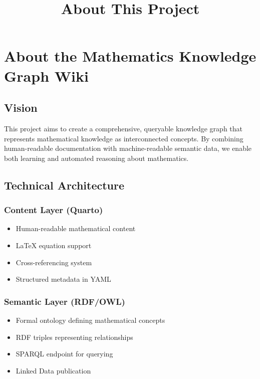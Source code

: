 \documentclass[
  11pt,
  a4paper,
]{article}
\title{About This Project}
\author{}
\date{}
\providecommand{\tightlist}{%
  \setlength{\itemsep}{0pt}\setlength{\parskip}{0pt}}
\begin{document}
\maketitle


\section{About the Mathematics Knowledge Graph
Wiki}\label{about-the-mathematics-knowledge-graph-wiki}

\subsection{Vision}\label{vision}

This project aims to create a comprehensive, queryable knowledge graph
that represents mathematical knowledge as interconnected concepts. By
combining human-readable documentation with machine-readable semantic
data, we enable both learning and automated reasoning about mathematics.

\subsection{Technical Architecture}\label{technical-architecture}

\subsubsection{Content Layer (Quarto)}\label{content-layer-quarto}

\begin{itemize}
\tightlist
\item
  Human-readable mathematical content
\item
  LaTeX equation support
\item
  Cross-referencing system
\item
  Structured metadata in YAML
\end{itemize}

\subsubsection{Semantic Layer (RDF/OWL)}\label{semantic-layer-rdfowl}

\begin{itemize}
\tightlist
\item
  Formal ontology defining mathematical concepts
\item
  RDF triples representing relationships
\item
  SPARQL endpoint for querying
\item
  Linked Data publication
\end{itemize}
\end{document}
